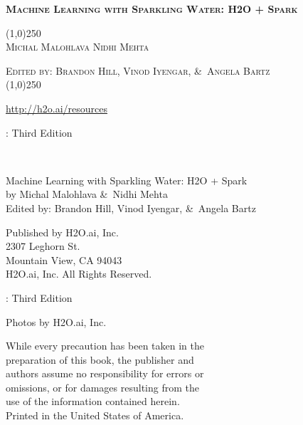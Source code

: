 


%
%
\usepackage{tabularx}
\usepackage{booktabs}
\usepackage{forest}
\usepackage{url}
\usepackage{longtable}
\def\UrlBreaks{\do\/\do-\do_\do.}



\thispagestyle{empty} %

\begin{center}
\textsc{\large\bf{Machine Learning with Sparkling Water: H2O + Spark}}

\bigskip
\line(1,0){250}  %
\\
\bigskip
\textsc{\small{Michal Malohlava\hspace{20pt} Nidhi Mehta}}

\textsc{\small{Edited by: Brandon Hill, Vinod Iyengar, \&\ Angela Bartz}}
\\
\bigskip
\line(1,0){250}  %


{\url{http://h2o.ai/resources}}

\bigskip
\monthname \hspace{1pt}  \the\year: Third Edition 
\\%
\bigskip
\end{center}

\newpage
\null\vfill %

\thispagestyle{empty}%


{\raggedright\vfill\ 

Machine Learning with Sparkling Water: H2O + Spark\\
  by Michal Malohlava \&\ Nidhi Mehta\\
  Edited by: Brandon Hill, Vinod Iyengar, \&\ Angela Bartz 
  
\bigskip
  Published by H2O.ai, Inc. \\
2307 Leghorn St. \\
Mountain View, CA 94043\\
\bigskip
\textcopyright \hspace{1pt} \the\year \hspace{1pt} H2O.ai, Inc. All Rights Reserved. 
\bigskip

\monthname \hspace{1pt}  \the\year: Third Edition
\bigskip

Photos by \textcopyright H2O.ai, Inc. 
\bigskip

While every precaution has been taken in the\\
preparation of this book, the publisher and\\
authors assume no responsibility for errors or\\
omissions, or for damages resulting from the\\
use of the information contained herein.\\
\bigskip
Printed in the United States of America. 


}\par

